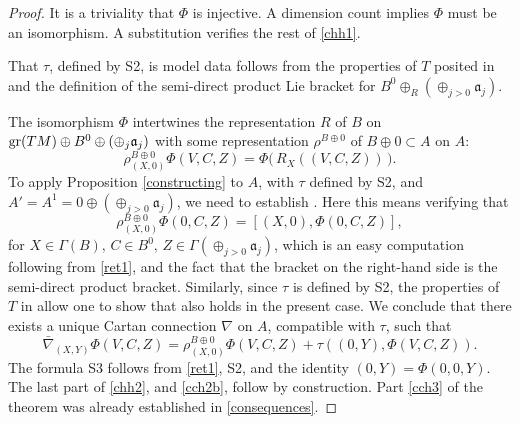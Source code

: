 \documentclass[leqno,12pt]{amsart} %
\begin{document}
\begin{proof}
  It is a triviality that $\Phi $ is injective. A dimension count implies $\Phi$ must be an
  isomorphism. A substitution verifies the rest of \eqref{chh1}.

  That $\tau $, defined by S2, is model data follows from the properties of $T$ posited in
   and the definition of the semi-direct product Lie bracket for
  $B^0 \oplus_R(\oplus_{j>0} {\mathfrak a}_j)$.

  The isomorphism $\Phi$ intertwines the representation $R$ of $B$ on
  $\operatorname{\operatorname{gr}}(TM) \oplus B^0 \oplus (\oplus_j {\mathfrak a}_j)$ with some representation
  $\rho^{B \oplus 0}$ of $B \oplus 0 \subset A$ on $A$:
  \begin{equation}
    \rho^{B \oplus 0}_{(X,0)}\Phi(V, C, Z) = \Phi\Big(\,R_X((V, C, Z))\,\Big).\label{ret1}
  \end{equation}
  To apply Proposition \ref{constructing} to $A$, with $\tau $ defined by
  S2, and $A'=A^1=0 \oplus (\oplus_{j>0} {\mathfrak a}_j)$, we need to
  establish . Here this means verifying that
  \begin{equation*}
    \rho^{B \oplus 0}_{(X,0)}\Phi(0, C, Z) = [(X,0), \Phi(0, C, Z)],
  \end{equation*}
  for $X \in \Gamma(B),\,C \in B^0,\,Z \in \Gamma(\oplus_{j>0}{\mathfrak a}_j)$, which is
  an easy computation following from \eqref{ret1}, and the fact that the bracket on the
  right-hand side is the semi-direct product bracket. Similarly, since $\tau $ is defined
  by S2, the properties of $T$ in  allow one to show that
   also holds in the present case. We conclude that there
  exists a unique Cartan connection $\nabla $ on $A$, compatible with $\tau $,
  such that
  \begin{equation*}
    \bar\nabla_{(X,Y)} \Phi(V, C, Z) = \rho^{B \oplus 0}_{(X,0)} \Phi (V, C, Z)
      + \tau((0,Y), \Phi(V, C, Z)).
  \end{equation*}
  The formula S3 follows from \eqref{ret1}, S2, and the identity $(0, Y) = \Phi(0, 0,
  Y)$. The last part of \eqref{chh2}, and \eqref{cch2b}, follow by construction. Part
  \eqref{cch3} of the theorem was already established in \ref{consequences}.
\end{proof}
\end{document}
